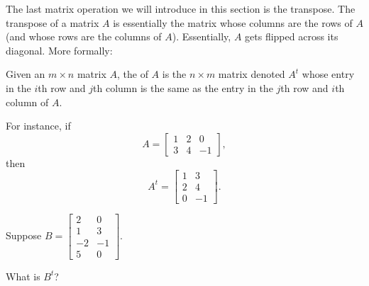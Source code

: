 \endedxtext

\endedxvertical





\endedxvertical



The last matrix operation we will introduce in this section is the transpose.  The transpose of a matrix $A$
is essentially the matrix whose columns are the rows of $A$ (and whose rows are the columns of $A$).  Essentially,
$A$ gets flipped across its diagonal.  More formally:

{}  Given an $m\times n$ matrix $A$, the {} of $A$ is the
$n\times m$ matrix denoted $A^t$ whose entry in the $i$th row and $j$th column is the same as the
entry in the $j$th row and $i$th column of $A$.  

For instance, if \[A = \left[ \begin{array}{ccc} 1 & 2 & 0  \\
3 & 4 & -1
 \end{array} \right],\] then \[A^t  = \left[ \begin{array}{cc} 1 & 3  \\
2 & 4 \\ 0 & -1
 \end{array} \right].\]
 
\endedxtext



Suppose $B = \left[ \begin{array}{cc} 2 & 0  \\
1 & 3 \\ -2 & -1 \\ 5 & 0
 \end{array} \right].$  
 
What is $B^t$?  





\endedxproblem



